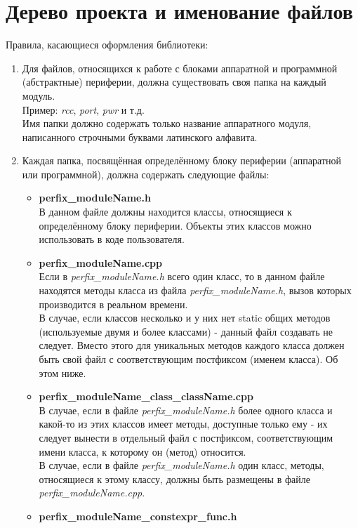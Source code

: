 \chapter{Дерево проекта и именование файлов}\label{dn:0}
Правила, касающиеся оформления библиотеки:
\begin{enumerate}
	\item Для файлов, относящихся к работе с блоками аппаратной и программной (абстрактные) периферии, должна существовать своя папка на каждый модуль.\\
	Пример: \textit{rcc}, \textit{port}, \textit{pwr} и т.д.\\
	Имя папки должно содержать только название аппаратного модуля, написанного строчными буквами латинского алфавита.
	
	\item Каждая папка, посвящённая определённому блоку периферии (аппаратной или программной), должна содержать следующие файлы:
	\begin{itemize}
		\item \textbf{perfix\-\_module\-Name.h}\\
		В данном файле должны находится классы, относящиеся к определённому блоку периферии. Объекты этих классов можно использовать в коде пользователя.
		\item \textbf{perfix\-\_module\-Name.cpp}\\
		Если в \textit{perfix\_moduleName.h} всего один класс, то в данном файле находятся методы класса из файла \textit{perfix\_moduleName.h}, вызов которых производится в реальном времени.\\
		В случае, если классов несколько и у них нет static общих методов (используемые двумя и более классами) - данный файл создавать не следует. Вместо этого для уникальных методов каждого класса должен быть свой файл с соответствующим постфиксом (именем класса). Об этом ниже.
		\item \textbf{perfix\-\_moduleName\-\_class\-\_class\-Name.cpp}\\
		В случае, если в файле \textit{perfix\-\_moduleName.h} более одного класса и какой-то из этих классов имеет методы, доступные только ему - их следует вынести в отдельный файл с постфиксом, соответствующим имени класса, к которому он (метод) относится.\\
		В случае, если в файле \textit{perfix\-\_module\-Name.h} один класс, методы, относящиеся к этому классу, должны быть размещены в файле \textit{perfix\_\-moduleName.cpp}.
		\item \textbf{perfix\-\_module\-Name\-\_constexpr\-\_func.h}\\

\end{itemize}
\end{enumerate}
